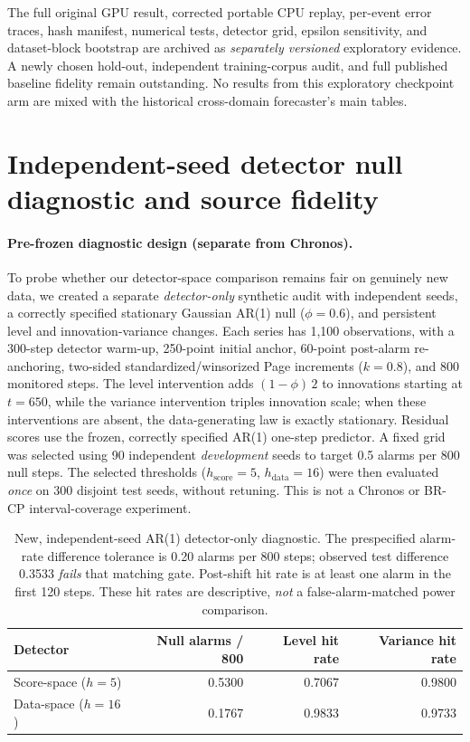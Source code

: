 \documentclass[10pt]{article}
\begin{document}
The full original GPU result, corrected portable CPU replay,
per-event error traces, hash manifest, numerical tests, detector
grid, epsilon sensitivity, and dataset-block bootstrap are archived
as \emph{separately versioned} exploratory evidence. A newly chosen
hold-out, independent training-corpus audit, and full published
baseline fidelity remain outstanding. No results from this exploratory
checkpoint arm are mixed with the historical cross-domain forecaster's
main tables.


\section{Independent-seed detector null diagnostic and source fidelity}
\label{sec:fresh_detectors}

\paragraph{Pre-frozen diagnostic design (separate from Chronos).}
To probe whether our detector-space comparison remains fair on genuinely
new data, we created a separate \emph{detector-only} synthetic audit with
independent seeds, a correctly specified stationary Gaussian AR(1) null
($\phi=0.6$), and persistent level and innovation-variance changes.
Each series has 1,100 observations, with a 300-step detector warm-up,
250-point initial anchor, 60-point post-alarm re-anchoring, two-sided
standardized/winsorized Page increments ($k=0.8$), and 800 monitored steps.
The level intervention adds $(1-\phi)\,2$ to innovations starting at
$t=650$, while the variance intervention triples innovation scale;
when these interventions are absent, the data-generating law is exactly
stationary. Residual scores use the frozen, correctly specified AR(1)
one-step predictor. A fixed grid was selected using 90 independent
\emph{development} seeds to target 0.5 alarms per 800 null steps.
The selected thresholds ($h_{\mathrm{score}}=5$, $h_{\mathrm{data}}=16$)
were then evaluated \emph{once} on 300 disjoint test seeds, without
retuning. This is not a Chronos or BR-CP interval-coverage experiment.

\begin{table}[ht]
\centering
\small
\caption{New, independent-seed AR(1) detector-only diagnostic. The
prespecified alarm-rate difference tolerance is 0.20 alarms per 800
steps; observed test difference 0.3533 \emph{fails} that matching gate.
Post-shift hit rate is at least one alarm in the first 120 steps. These
hit rates are descriptive, \emph{not} a false-alarm-matched power comparison.}
\label{tab:fresh_detectors}
\begin{tabular}{lrrr}
\toprule
Detector & Null alarms / 800 & Level hit rate & Variance hit rate \\
\midrule
Score-space ($h=5$) & 0.5300 & 0.7067 & 0.9800 \\
Data-space ($h=16$) & 0.1767 & 0.9833 & 0.9733 \\
\bottomrule
\end{tabular}
\end{table}
\end{document}
